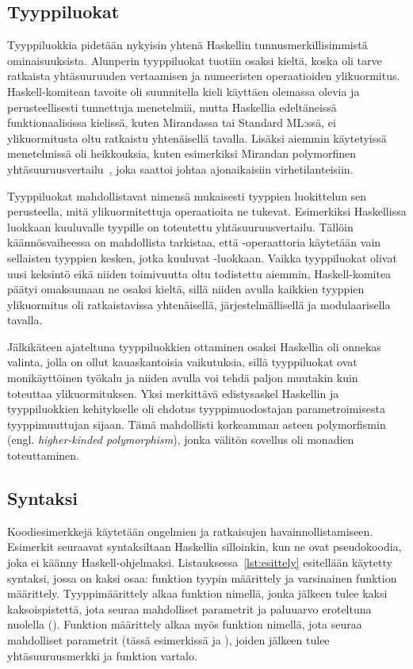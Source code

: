 \documentclass[finnish]{tktltiki2}
\begin{document}
\subsection{Tyyppiluokat}

Tyyppiluokkia pidetään nykyisin yhtenä Haskellin tunnusmerkillisimmistä ominaisuuksista. Alunperin
tyyppiluokat tuotiin osaksi kieltä, koska oli tarve ratkaista yhtäsuuruuden vertaamisen ja
numeeristen operaatioiden ylikuormitus. Haskell-komitean tavoite oli suunnitella kieli käyttäen
olemassa olevia ja perusteellisesti tunnettuja menetelmiä, mutta Haskellia edeltäneissä
funktionaalisissa kielissä, kuten Mirandassa tai Standard ML:ssä, ei ylikuormitusta oltu ratkaistu
yhtenäisellä tavalla. Lisäksi aiemmin käytetyissä menetelmissä oli heikkouksia, kuten esimerkiksi
Mirandan polymorfinen yhtäsuuruusvertailu~, joka saattoi johtaa ajonaikaisiin
virhetilanteisiin.

Tyyppiluokat mahdollistavat nimensä mukaisesti tyyppien luokittelun sen perusteella, mitä
ylikuormitettuja operaatioita ne tukevat. Esimerkiksi Haskellissa luokkaan  kuuluvalle
tyypille on toteutettu yhtäsuuruusvertailu. Tällöin käännösvaiheessa on mahdollista tarkistaa, että
\code{==}-operaattoria käytetään vain sellaisten tyyppien kesken, jotka kuuluvat
-luokkaan. Vaikka tyyppiluokat olivat uusi keksintö eikä niiden toimivuutta oltu
todistettu aiemmin, Haskell-komitea päätyi omaksumaan ne osaksi kieltä, sillä niiden avulla kaikkien
tyyppien ylikuormitus oli ratkaistavissa yhtenäisellä, järjestelmällisellä ja modulaarisella
tavalla.

Jälkikäteen ajateltuna tyyppiluokkien ottaminen osaksi Haskellia oli onnekas valinta,
jolla on ollut kauaskantoisia vaikutuksia, sillä tyyppiluokat ovat monikäyttöinen työkalu ja niiden
avulla voi tehdä paljon muutakin kuin toteuttaa ylikuormituksen. Yksi merkittävä edistysaskel
Haskellin ja tyyppiluokkien kehitykselle oli ehdotus tyyppimuodostajan parametroimisesta
tyyppimuuttujan sijaan. Tämä mahdollisti korkeamman asteen polymorfismin (engl. \emph{higher-kinded
polymorphism}), jonka välitön sovellus oli monadien toteuttaminen.

\subsection{Syntaksi}


Koodiesimerkkejä käytetään ongelmien ja ratkaisujen havainnollistamiseen. Esimerkit seuraavat
syntaksiltaan Haskellia silloinkin, kun ne ovat pseudokoodia, joka ei käänny Haskell-ohjelmaksi.
Listauksessa~\ref{lst:esittely} esitellään käytetty syntaksi, jossa on kaksi osaa: funktion tyypin
määrittely ja varsinainen funktion määrittely. Tyyppimäärittely alkaa funktion nimellä, jonka
jälkeen tulee kaksi kaksoispistettä, jota seuraa mahdolliset parametrit ja paluuarvo eroteltuna
nuolella (\code{->}). Funktion määrittely alkaa myös funktion nimellä, jota seuraa mahdolliset
parametrit (tässä esimerkissä  ja ), joiden jälkeen tulee yhtäsuuruusmerkki ja
funktion vartalo.
\end{document}
